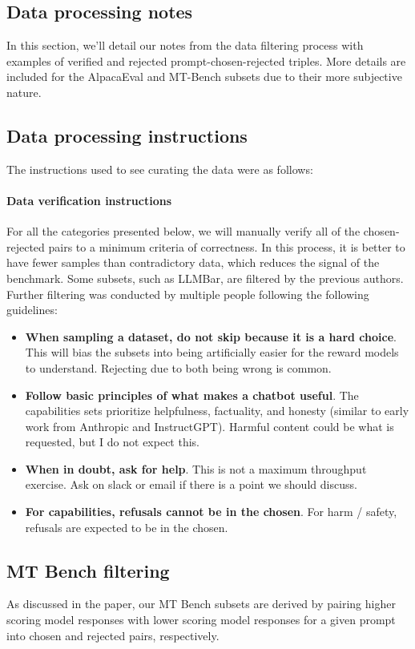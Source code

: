 \begin{appendices}
\section{Data processing notes}
\label{appdx:processing}
In this section, we'll detail our notes from the data filtering process with examples of verified and rejected prompt-chosen-rejected triples.
More details are included for the AlpacaEval and MT-Bench subsets due to their more subjective nature.

\subsection{Data processing instructions}
The instructions used to see curating the data were as follows:

\paragraph{Data verification instructions}
For all the categories presented below, we will manually verify all of the chosen-rejected pairs to a minimum criteria of correctness. In this process, it is better to have fewer samples than contradictory data, which reduces the signal of the benchmark. Some subsets, such as LLMBar, are filtered by the previous authors. Further filtering was conducted by multiple people following the following guidelines:
\begin{itemize}
    \item[1.] \textbf{When sampling a dataset, do not skip because it is a hard choice}. This will bias the subsets into being artificially easier for the reward models to understand. Rejecting due to both being wrong is common.
    \item[2.] \textbf{Follow basic principles of what makes a chatbot useful}. The capabilities sets prioritize helpfulness, factuality, and honesty (similar to early work from Anthropic and InstructGPT). Harmful content could be what is requested, but I do not expect this.
    \item[3.] \textbf{When in doubt, ask for help}. This is not a maximum throughput exercise. Ask on slack or email if there is a point we should discuss. 
    \item[4.] \textbf{For capabilities, refusals cannot be in the chosen}. For harm / safety, refusals are expected to be in the chosen.
\end{itemize}

\subsection{MT Bench filtering}
\label{appndx:mtbench}
As discussed in the paper, our MT Bench subsets are derived by pairing higher scoring model responses with lower scoring model responses for a given prompt into chosen and rejected pairs, respectively. 


\end{appendices}
